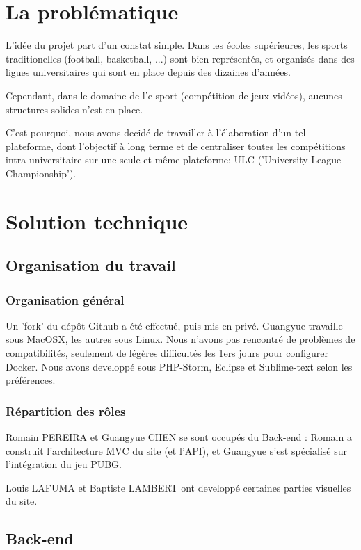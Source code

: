 \documentclass[10pt]{article}
\begin{document}
  \newpage
  \section{La problématique}
    L'idée du projet part d'un constat simple.
    Dans les écoles supérieures, les sports traditionelles (football, basketball, ...)
    sont bien représentés, et organisés dans des ligues universitaires qui sont en place depuis des dizaines d'années.
    
    Cependant, dans le domaine de l'e-sport (compétition de jeux-vidéos), aucunes structures solides n'est en place.
    
    C'est pourquoi, nous avons decidé de travailler à l'élaboration d'un tel plateforme, dont l'objectif à long terme
    et de centraliser toutes les compétitions intra-universitaire sur une seule et même plateforme: ULC ('University League Championship').
    
  
  \newpage
  \section{Solution technique}
    \subsection{Organisation du travail}
      \subsubsection{Organisation général}
	Un 'fork' du dépôt Github a été effectué, puis mis en privé. Guangyue travaille sous MacOSX, les autres sous Linux.
	Nous n'avons pas rencontré de problèmes de compatibilités, seulement de légères difficultés les 1ers jours pour configurer Docker.
	Nous avons developpé sous PHP-Storm, Eclipse et Sublime-text selon les préférences.
      \subsubsection{Répartition des rôles}
	Romain PEREIRA et Guangyue CHEN se sont occupés du Back-end : Romain a construit l'architecture MVC du site (et l'API),
	et Guangyue s'est spécialisé sur l'intégration du jeu PUBG.
	
	Louis LAFUMA et Baptiste LAMBERT ont developpé certaines parties visuelles du site.
    \subsection{Back-end}
\end{document}

